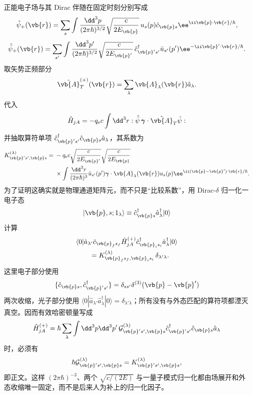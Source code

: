 \begin{derivation}[电磁顶角在模式基中的矩阵元]
正能电子场与其 Dirac 伴随在固定时刻分别写成
\[
\hat\psi_+(\vb{r})
=\sum_s\int\frac{\dd^3p}{(2\pi\hbar)^{3/2}}
\sqrt{\frac{c}{2E_{\vb{p}}}}
\,u_s(p)\hat c_{\vb{p}s}
 \ee^{\ii\vb{p}\cdot\vb{r}/\hbar},
\]
\[
\hat{\bar\psi}_+(\vb{r})
=\sum_{s'}\int\frac{\dd^3p'}{(2\pi\hbar)^{3/2}}
\sqrt{\frac{c}{2E_{\vb{p}'}}}
\,\hat c_{\vb{p}'s'}^\dagger\bar u_{s'}(p')
 \ee^{-\ii\vb{p}'\cdot\vb{r}/\hbar}.
\]
取矢势正频部分
\[
\hat{\vb{A}}^{(+)}_T(\vb{r})
=\sum_\lambda\vb{A}_\lambda(\vb{r})\hat a_\lambda.
\]
代入
\[
\hat H_{jA}=-q_{\mathrm e} c\int\dd^3r:
\hat{\bar\psi}\,\boldsymbol\gamma\cdot\hat{\vb{A}}_T\hat\psi:
\]
并抽取算符单项
$\hat c_{\vb{p}'s'}^\dagger\hat c_{\vb{p}s}\hat a_\lambda$，其系数为
\begin{align*}
K^{(\lambda)}_{\vb{p}'s',\vb{p}s}
={}&-q_{\mathrm e} c
\sqrt{\frac{c}{2E_{\vb{p}'}}}
\sqrt{\frac{c}{2E_{\vb{p}}}}\\
&\times\int\frac{\dd^3r}{(2\pi\hbar)^3}
\bar u_{s'}(p')
\boldsymbol\gamma\cdot\vb{A}_\lambda(\vb{r})
 u_s(p)
 \ee^{\ii(\vb{p}-\vb{p}')\cdot\vb{r}/\hbar}.
\end{align*}
为了证明这确实就是物理通道矩阵元，而不只是“比较系数”，用 Dirac-$\delta$ 归一化一电子态
\[
|\vb{p},s;1_\lambda\rangle
\equiv
\hat c_{\vb{p}s}^\dagger\hat a_\lambda^\dagger|0\rangle
\]
计算
\begin{align*}
&\langle0|\hat a_{\lambda'}
\hat c_{\vb{p}_f s_f}
\hat H_{jA}^{(+)}
\hat c_{\vb{p}_i s_i}^\dagger
\hat a_\lambda^\dagger|0\rangle\\
&\qquad=
K^{(\lambda)}_{\vb{p}_f s_f,\vb{p}_i s_i}
\,\delta_{\lambda'\lambda}.
\end{align*}
这里电子部分使用
\[
\{\hat c_{\vb{p}s},\hat c_{\vb{p}'s'}^\dagger\}
=\delta_{ss'}\delta^{(3)}(\vb{p}-\vb{p}')
\]
两次收缩，光子部分使用
$\langle0|\hat a_{\lambda'}\hat a_\lambda^\dagger|0\rangle=\delta_{\lambda'\lambda}$；所有没有与外态匹配的算符项都湮灭真空。因而有效哈密顿量写成
\[
\hat H_{jA}^{(+)}
=\hbar\sum_\lambda\int\dd^3p\dd^3p'\,
\mathcal G^{(\lambda)}_{\vb{p}'s',\vb{p}s}
\hat c_{\vb{p}'s'}^\dagger\hat c_{\vb{p}s}\hat a_\lambda
\]
时，必须有
\[
\hbar\mathcal G^{(\lambda)}_{\vb{p}'s',\vb{p}s}
=K^{(\lambda)}_{\vb{p}'s',\vb{p}s},
\]
即正文。这样 $(2\pi\hbar)^{-3}$、两个 $\sqrt{c/(2E)}$ 与一量子模式归一化都由场展开和外态收缩唯一固定，而不是后来人为补上的归一化因子。
\end{derivation}
